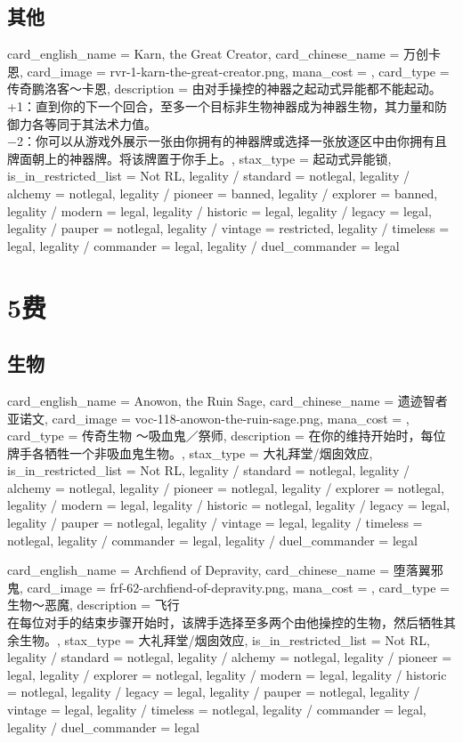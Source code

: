 \documentclass[lang = cn, color = black, 10pt]{AllThatStax}
\begin{document}
\section{其他}

\card
{
	card_english_name = {Karn, the Great Creator},
	card_chinese_name = {万创卡恩},
	card_image = rvr-1-karn-the-great-creator.png,
	mana_cost = ,
	card_type = 传奇鹏洛客～卡恩,
	description = {由对手操控的神器之起动式异能都不能起动。\\
+1：直到你的下一个回合，至多一个目标非生物神器成为神器生物，其力量和防御力各等同于其法术力值。\\
−2：你可以从游戏外展示一张由你拥有的神器牌或选择一张放逐区中由你拥有且牌面朝上的神器牌。将该牌置于你手上。},
	stax_type = 起动式异能锁,
	is_in_restricted_list = Not RL,
	legality / standard = notlegal,
	legality / alchemy = notlegal,
	legality / pioneer = banned,
	legality / explorer = banned,
	legality / modern = legal,
	legality / historic = legal,
	legality / legacy = legal,
	legality / pauper = notlegal,
	legality / vintage = restricted,
	legality / timeless = legal,
	legality / commander = legal,
	legality / duel_commander = legal
}

\chapter{5费}

\section{生物}

\card
{
	card_english_name = {Anowon, the Ruin Sage},
	card_chinese_name = {遗迹智者亚诺文},
	card_image = voc-118-anowon-the-ruin-sage.png,
	mana_cost = ,
	card_type = 传奇生物 ～吸血鬼／祭师,
	description = {在你的维持开始时，每位牌手各牺牲一个非吸血鬼生物。},
	stax_type = 大礼拜堂/烟囱效应,
	is_in_restricted_list = Not RL,
	legality / standard = notlegal,
	legality / alchemy = notlegal,
	legality / pioneer = notlegal,
	legality / explorer = notlegal,
	legality / modern = legal,
	legality / historic = notlegal,
	legality / legacy = legal,
	legality / pauper = notlegal,
	legality / vintage = legal,
	legality / timeless = notlegal,
	legality / commander = legal,
	legality / duel_commander = legal
}

\card
{
	card_english_name = {Archfiend of Depravity},
	card_chinese_name = {堕落翼邪鬼},
	card_image = frf-62-archfiend-of-depravity.png,
	mana_cost = ,
	card_type = 生物～恶魔,
	description = {飞行\\
在每位对手的结束步骤开始时，该牌手选择至多两个由他操控的生物，然后牺牲其余生物。},
	stax_type = 大礼拜堂/烟囱效应,
	is_in_restricted_list = Not RL,
	legality / standard = notlegal,
	legality / alchemy = notlegal,
	legality / pioneer = legal,
	legality / explorer = notlegal,
	legality / modern = legal,
	legality / historic = notlegal,
	legality / legacy = legal,
	legality / pauper = notlegal,
	legality / vintage = legal,
	legality / timeless = notlegal,
	legality / commander = legal,
	legality / duel_commander = legal
}
\end{document}
